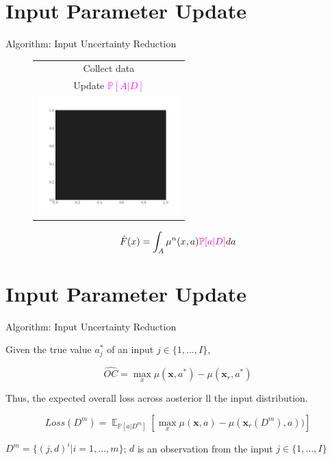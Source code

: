 \documentclass{beamer}
\DeclareMathOperator{\EX}{\mathbb{E}}%
\begin{document}
\section{Input Parameter Update}
\begin{frame}{Algorithm: Input Uncertainty Reduction}

\begin{figure}
	\centering
	\begin{tabular}{c}
		Collect data\\
		Update \textcolor{magenta}{$\mathbb{P}[A|D]$}\\
		\includegraphics[width=5.5cm]{FILLING.png}\\
	\end{tabular}
	
	$$ \hat{F}(x) = \int_{A} \mu^{n} (x,a) \textcolor{magenta}{\mathbb{P}[a|D]}da$$
\end{figure}

\end{frame}

\section{Input Parameter Update}
\begin{frame}{Algorithm: Input Uncertainty Reduction}

Given the true value $a_{j}^{*}$ of an input $j \in \{1, . . . , I\}$,

$$\widehat{OC} = \max_{x}\mu(\mathbf{x},a^{*}) - \mu(\mathbf{x}_{r},a^{*})$$

Thus, the expected overall loss across aosterior ll the input distribution.

$$Loss(D^{m}) = \EX_{\mathbb{P}[a|D^{m}]}[\max_{x}\mu(\mathbf{x},a) - \mu(\mathbf{x}_{r}(D^{m}),a))]$$

$D^{m} = \{(j	,d)^{i}|i = 1, . . . ,m\}$; $d$ is an observation from the input $j \in \{1, . . . , I \}$
\end{frame}
\end{document}
